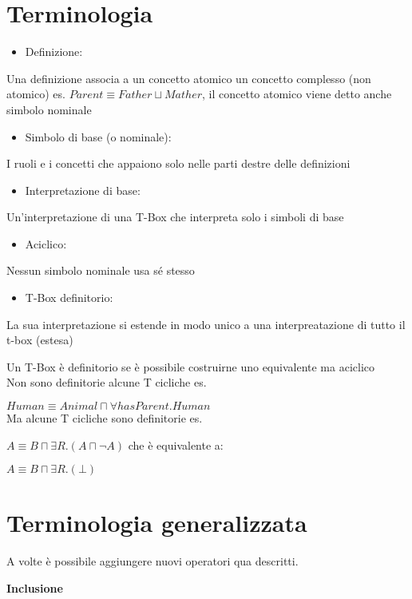 \section{Terminologia}
\begin{itemize}
\item Definizione: 
\end{itemize}
Una definizione associa a un concetto atomico un concetto complesso
(non atomico) es. $Parent\equiv Father\sqcup Mather$, il concetto
atomico viene detto anche simbolo nominale
\begin{itemize}
\item Simbolo di base (o nominale):
\end{itemize}
I ruoli e i concetti che appaiono solo nelle parti destre delle definizioni
\begin{itemize}
\item Interpretazione di base:
\end{itemize}
Un'interpretazione di una T-Box che interpreta solo i simboli di base
\begin{itemize}
\item Aciclico:
\end{itemize}
Nessun simbolo nominale usa sé stesso
\begin{itemize}
\item T-Box definitorio:
\end{itemize}
La sua interpretazione si estende in modo unico a una interpreatazione
di tutto il t-box (estesa)

Un T-Box è definitorio se è possibile costruirne uno equivalente ma
aciclico\\


Non sono definitorie alcune T cicliche es.

$Human\equiv Animal\sqcap\forall hasParent.Human$\\


Ma alcune T cicliche sono definitorie es.

$A\equiv B\sqcap\exists R.(A\sqcap\neg A)$ che è equivalente a:

$A\equiv B\sqcap\exists R.(\bot)$ 


\section{Terminologia generalizzata}

A volte è possibile aggiungere nuovi operatori qua descritti.

\textbf{Inclusione}

